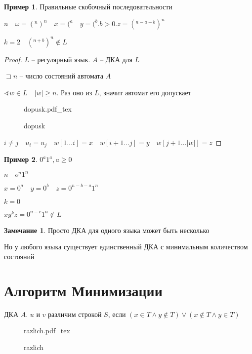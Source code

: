 \documentclass{book}
\theoremstyle{definition}
\newtheorem*{note}{Замечание}
\newtheorem*{example}{Пример}
\newcommand{\incfig}[1]{%
    \def\svgwidth{\columnwidth}
    {#1.pdf_tex}
}
\begin{document}
\begin{example}
    Правильные скобочный последовательности

    $n\quad \omega = (^n)^n\quad x = (^a\quad y = (^b. b>0. z = (^{n-a-b})^n$

    $k = 2\quad (^{n+b})^n\not\in L$
\end{example}

\begin{proof}
    $L$ -- регулярный язык.  $A$ -- ДКА для  $L$ 

    $\sqsupset n$ -- число состояний автомата $A$

     $\sphericalangle w\in L\quad \left| w \right| \geqslant n$. Раз оно из $L$, значит автомат его допускает

\begin{figure}[!ht]
    \centering
    \incfig{dopusk}
    \caption{dopusk}
    \label{fig:dopusk}
\end{figure}

$i\neq j\quad  u_i = u_j\quad w[1 \ldots i] = x\quad w[i+1 \ldots j] = y\quad w[j+1 \ldots |w|] = z$
\end{proof}

\begin{example}
    $0^a 1^a, a\geqslant 0$

    $n\quad o^n 1^n$

    $x = 0^a\quad y = 0^b\quad z = 0^{n-b-a}1^n$

     $k = 0$

     $xy^kz = 0^{n-c}1^n\not\in L$
\end{example}

\begin{note}
    Просто ДКА для одного языка может быть несколько

    Но у любого языка существует единственный ДКА с минимальным количеством состояний
\end{note}

\section{Алгоритм Минимизации}

ДКА $A$.  $u$ и  $v$ различим строкой  $S$, если $\left( x\in T \land y\not\in T \right) \lor \left( x\not\in T\land y\in T \right) $

\begin{figure}[!ht]
    \centering
    \incfig{razlich}
    \caption{razlich}
    \label{fig:razlich}
\end{figure}
\end{document}
